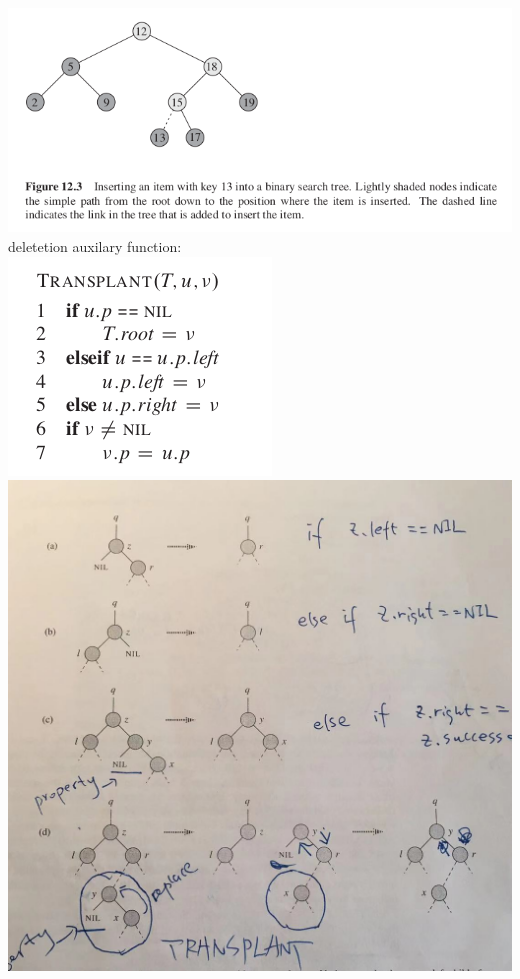 \documentclass[11pt]{article}
\begin{document}
\includegraphics[width=.9\linewidth]{pics/c12_tree_insert_fig.png} \\


deletetion auxilary function: \\

\includegraphics[width=.9\linewidth]{pics/c12_transplant.png} \\


\includegraphics[width=.9\linewidth]{pics/c12_tree_delete_fig.jpeg} \\
\end{document}
